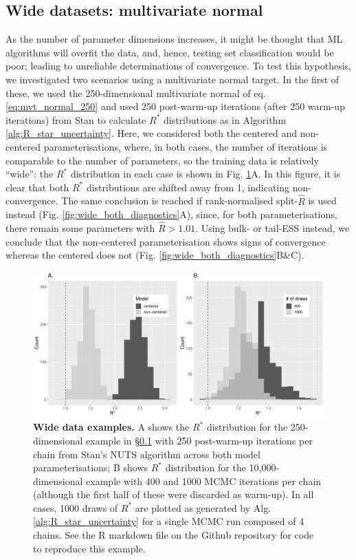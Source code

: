\documentclass{article}
\begin{document}
\subsection{Wide datasets: multivariate normal}\label{sec:wide}
As the number of parameter dimensions increases, it might be thought that ML algorithms will overfit the data, and, hence, testing set classification would be poor; leading to unreliable determinations of convergence. To test this hypothesis, we investigated two scenarios using a multivariate normal target. In the first of these, we used the 250-dimensional multivariate normal of eq. \eqref{eq:mvt_normal_250} and used 250 post-warm-up iterations (after 250 warm-up iterations) from Stan to calculate $R^*$ distributions as in Algorithm \ref{alg:R_star_uncertainty}. Here, we considered both the centered and non-centered parameterisations, where, in both cases, the number of iterations is comparable to the number of parameters, so the training data is relatively ``wide'': the $R^*$ distribution in each case is shown in Fig. \ref{fig:mvt_wide_both}A. In this figure, it is clear that both $R^*$ distributions are shifted away from 1, indicating non-convergence. The same conclusion is reached if rank-normalised split-$\widehat{R}$ is used instead (Fig. \ref{fig:wide_both_diagnostics}A), since, for both parameterisations, there remain some parameters with $\widehat{R}>1.01$. Using bulk- or tail-ESS instead, we conclude that the non-centered parameterisation shows signs of convergence whereas the centered does not (Fig. \ref{fig:wide_both_diagnostics}B\&C). 

\begin{figure}[!htb]
	\centerline{\includegraphics[width=1\textwidth]{../output/mvt_wide_both.pdf}}
	\caption{\textbf{Wide data examples.} A shows the $R^*$ distribution for the 250-dimensional example in \S\ref{sec:wide} with 250 post-warm-up iterations per chain from Stan's NUTS algorithm across both model parameterisations; B shows $R^*$ distribution for the 10,000-dimensional example with 400 and 1000 MCMC iterations per chain (although the first half of these were discarded as warm-up). In all cases, 1000 draws of $R^*$ are plotted as generated by Alg. \ref{alg:R_star_uncertainty} for a single MCMC run composed of 4 chains. See the R markdown file on the Github repository for code to reproduce this example.}
	\label{fig:mvt_wide_both}
\end{figure}
\end{document}
